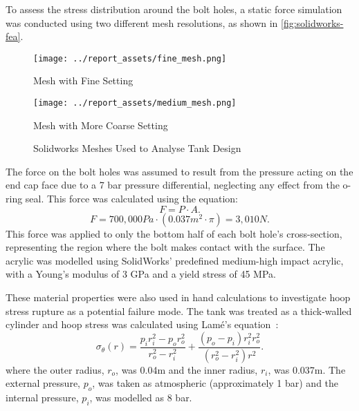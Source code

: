 To assess the stress distribution around the bolt holes, a static force simulation was conducted using two different mesh resolutions, as shown in \autoref{fig:solidworks-fea}. 
\begin{figure}[htbp]
    \centering

    \begin{minipage}{0.45\textwidth}
        \centering
        \texttt{[image: ../report\_assets/fine\_mesh.png]}
        \caption*{Mesh with Fine Setting}
    \end{minipage}
    \hfill
    \begin{minipage}{0.45\textwidth}
        \centering
        \texttt{[image: ../report\_assets/medium\_mesh.png]}
        \caption*{Mesh with More Coarse Setting}
    \end{minipage}
    \caption{Solidworks Meshes Used to Analyse Tank Design}\label{fig:solidworks-fea}
\end{figure}
The force on the bolt holes was assumed to result from the pressure acting on the end cap face due to a 7 bar pressure differential, neglecting any effect from the o-ring seal. This force was calculated using the equation:
\[
F = P \cdot A.
\]
\[
F = 700,000Pa \cdot (0.037m^2 \cdot \pi) = 3,010N.
\]
This force was applied to only the bottom half of each bolt hole's cross-section, representing the region where the bolt makes contact with the surface. The acrylic was modelled using SolidWorks' predefined medium-high impact acrylic, with a Young's modulus of 3 GPa and a yield stress of 45 MPa. 

These material properties were also used in hand calculations to investigate hoop stress rupture as a potential failure mode. The tank was treated as a thick-walled cylinder and hoop stress was calculated using Lamé's equation~\cite{mydatabook_lame}: 
\[
\sigma_\theta(r) = \frac{p_i r_i^2 - p_o r_o^2}{r_o^2 - r_i^2} + \frac{(p_o - p_i) r_i^2 r_o^2}{(r_o^2 - r_i^2) r^2}.
\]
where the outer radius, $r_o$, was 0.04m and the inner radius, $r_i$, was 0.037m. The external pressure, $p_o$, was taken as atmospheric (approximately 1 bar) and the internal pressure, $p_i$, was modelled as 8 bar.
